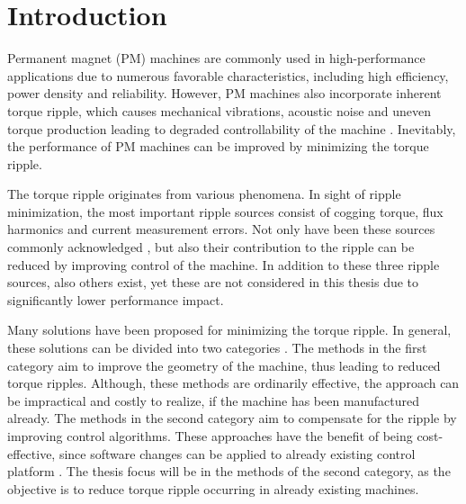 \section{Introduction}



\thispagestyle{empty}

Permanent magnet (PM) machines are commonly used in high-performance applications due to numerous favorable characteristics, including high efficiency, power density and reliability. However, PM machines also incorporate inherent torque ripple, which causes mechanical vibrations, acoustic noise and uneven torque production leading to degraded controllability of the machine \cite{ILC:2018}. Inevitably, the performance of PM machines can be improved by minimizing the torque ripple.

The torque ripple originates from various phenomena. In sight of ripple minimization, the most important ripple sources consist of cogging torque, flux harmonics and current measurement errors. Not only have been these sources commonly acknowledged \cite{ILC:2005,ILC:2012,CTR_SW:2017,ILC:2018}, but also their contribution to the ripple can be reduced by improving control of the machine. In addition to these three ripple sources, also others exist, yet these are not considered in this thesis due to significantly lower performance impact.


Many solutions have been proposed for minimizing the torque ripple. In general, these solutions can be divided into two categories \cite{CTR_SW:1993, CTR_SW:1998, CTR_SW:2017, ILC:2012, ILC:2018}. The methods in the first category aim to improve the geometry of the machine, thus leading to reduced torque ripples. Although, these methods are ordinarily effective, the approach can be impractical and costly to realize, if the machine has been manufactured already. The methods in the second category aim to compensate for the ripple by improving control algorithms. These approaches have the benefit of being cost-effective, since software changes can be applied to already existing control platform \cite{ILC:2018}. The thesis focus will be in the methods of the second category, as the objective is to reduce torque ripple occurring in already existing machines.


